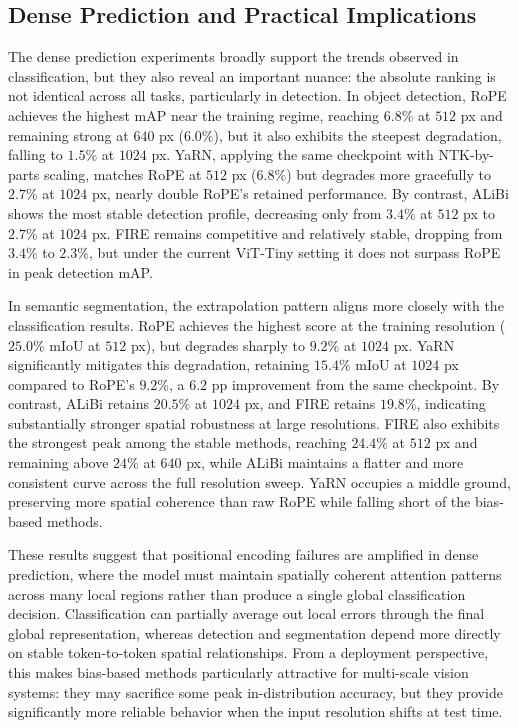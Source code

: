 \subsection{Dense Prediction and Practical Implications}

The dense prediction experiments broadly support the trends observed in classification, but they
also reveal an important nuance: the absolute ranking is not identical across all tasks,
particularly in detection. In object detection, RoPE achieves the highest mAP near the training
regime, reaching $6.8\%$ at $512$ px and remaining strong at $640$ px ($6.0\%$), but it also
exhibits the steepest degradation, falling to $1.5\%$ at $1024$ px. YaRN, applying the same
checkpoint with NTK-by-parts scaling, matches RoPE at $512$ px ($6.8\%$) but degrades more
gracefully to $2.7\%$ at $1024$ px, nearly double RoPE's retained performance. By contrast, ALiBi shows the
most stable detection profile, decreasing only from $3.4\%$ at $512$ px to $2.7\%$ at $1024$ px.
FIRE remains competitive and relatively stable, dropping from $3.4\%$ to $2.3\%$, but under the
current ViT-Tiny setting it does not surpass RoPE in peak detection mAP.

In semantic segmentation, the extrapolation pattern aligns more closely with the classification
results. RoPE achieves the highest score at the training resolution ($25.0\%$ mIoU at $512$ px),
but degrades sharply to $9.2\%$ at $1024$ px. YaRN significantly mitigates this degradation,
retaining $15.4\%$ mIoU at $1024$ px compared to RoPE's $9.2\%$, a $6.2$ pp improvement
from the same checkpoint. By contrast, ALiBi retains $20.5\%$ at $1024$ px,
and FIRE retains $19.8\%$, indicating substantially stronger spatial robustness at large
resolutions. FIRE also exhibits the strongest peak among the stable methods, reaching
$24.4\%$ at $512$ px and remaining above $24\%$ at $640$ px, while ALiBi maintains a flatter and
more consistent curve across the full resolution sweep. YaRN occupies a middle ground,
preserving more spatial coherence than raw RoPE while falling short of the bias-based methods.

These results suggest that positional encoding failures are amplified in dense prediction, where
the model must maintain spatially coherent attention patterns across many local regions rather than
produce a single global classification decision. Classification can partially average out local
errors through the final global representation, whereas detection and segmentation depend more
directly on stable token-to-token spatial relationships. From a deployment perspective, this makes
bias-based methods particularly attractive for multi-scale vision systems: they may sacrifice some
peak in-distribution accuracy, but they provide significantly more reliable behavior when the input
resolution shifts at test time.


